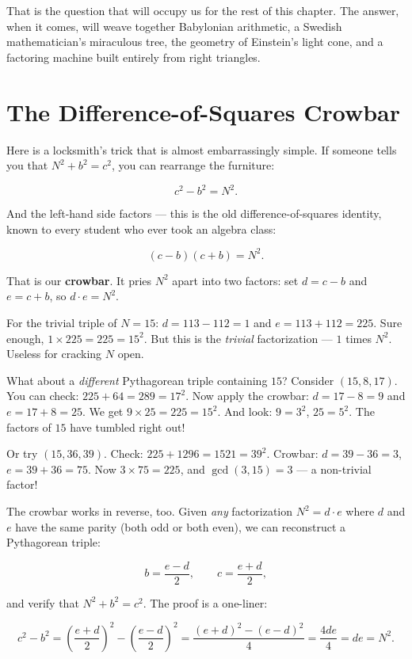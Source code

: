 That is the question that will occupy us for the rest of this chapter. The answer, when it comes, will weave together Babylonian arithmetic, a Swedish mathematician's miraculous tree, the geometry of Einstein's light cone, and a factoring machine built entirely from right triangles.


\bigskip


\section{The Difference-of-Squares Crowbar}

Here is a locksmith's trick that is almost embarrassingly simple. If someone tells you that $N^2 + b^2 = c^2$, you can rearrange the furniture:

\[
c^2 - b^2 = N^2.
\]

And the left-hand side factors --- this is the old difference-of-squares identity, known to every student who ever took an algebra class:

\[
(c - b)(c + b) = N^2.
\]

That is our \textbf{crowbar}. It pries $N^2$ apart into two factors: set $d = c - b$ and $e = c + b$, so $d \cdot e = N^2$.

For the trivial triple of $N = 15$: $d = 113 - 112 = 1$ and $e = 113 + 112 = 225$. Sure enough, $1 \times 225 = 225 = 15^2$. But this is the \textit{trivial} factorization --- $1$ times $N^2$. Useless for cracking $N$ open.

What about a \textit{different} Pythagorean triple containing $15$? Consider $(15, 8, 17)$. You can check: $225 + 64 = 289 = 17^2$. Now apply the crowbar: $d = 17 - 8 = 9$ and $e = 17 + 8 = 25$. We get $9 \times 25 = 225 = 15^2$. And look: $9 = 3^2$, $25 = 5^2$. The factors of $15$ have tumbled right out!

Or try $(15, 36, 39)$. Check: $225 + 1296 = 1521 = 39^2$. Crowbar: $d = 39 - 36 = 3$, $e = 39 + 36 = 75$. Now $3 \times 75 = 225$, and $\gcd(3, 15) = 3$ --- a non-trivial factor!

The crowbar works in reverse, too. Given \textit{any} factorization $N^2 = d \cdot e$ where $d$ and $e$ have the same parity (both odd or both even), we can reconstruct a Pythagorean triple:

\[
b = \frac{e - d}{2}, \qquad c = \frac{e + d}{2},
\]

and verify that $N^2 + b^2 = c^2$. The proof is a one-liner:

\[
c^2 - b^2 = \left(\frac{e+d}{2}\right)^{\!2} - \left(\frac{e-d}{2}\right)^{\!2} = \frac{(e+d)^2 - (e-d)^2}{4} = \frac{4de}{4} = de = N^2.
\]

